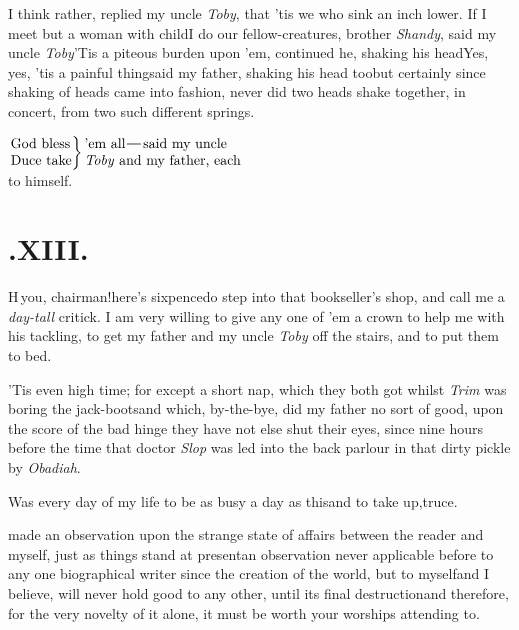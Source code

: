 \documentclass{article}
\begin{document}
I think rather, replied my uncle \textit{Toby}, that ’tis we who sink an inch lower.\tsh
If I meet but a woman with child\tsk I do
our fellow-creatures, brother \textit{Shandy}, said my uncle \textit{Toby}\tsk ’Tis a
piteous burden upon ’em, continued he, shaking his head\tsk Yes, yes, ’tis a painful
thing\tsk said my father, shaking his head too\tsh but certainly since shaking of heads
came into fashion, never did two heads shake together, in concert, from two such
different springs.

\indent$\displaystyle\left.\vcenter{\halign{#\rlap{\phantom{y}}\hss\cr
God bless\cr
Duce take\cr}}\right\}
\vcenter{\halign{#\hss\cr
’em all\tsk said my uncle\cr
\textit{Toby} and my father, each\cr}}$
\\[4pt] to himself.

\smallskip
\section{.\enspace XIII.}

\lettrine{H}{\,}\tsk you,
chairman!\tsk here’s\break
sixpence\tsk do step
into that book\-seller’s shop, and call me a
\textit{day-tall}\break
critick. I am very willing to give any one of ’em a crown to help me
with his tackling, to get my father and my uncle \textit{Toby} off
the stairs, and to put them to bed.\tsk

\tsk ’Tis even high time; for except a short nap, which
they both got whilst \textit{Trim} was boring the
jack-boots\tsk and which, by-the-bye, did my father no sort of
good, upon the score of the bad hinge\break
\tsk they have not else shut their eyes, since
nine hours before the time that doctor \textit{Slop} was led into the
back parlour in that dirty pickle by \textit{Obadiah}.

Was every day of my life to be as\break
busy a day as this\tsk and to take up,\tsk truce.

\noindent
{}
made an observation upon the strange state of affairs between the reader and myself,
just as things stand at present\tsk an observation never
applicable before to any one biographical writer since the creation
of the world, but to myself\tsk and I believe, will never hold
good to any other, until its final destruction\tsk and therefore,
for the very novelty of it alone, it must be worth your worships
attending to.
\end{document}
